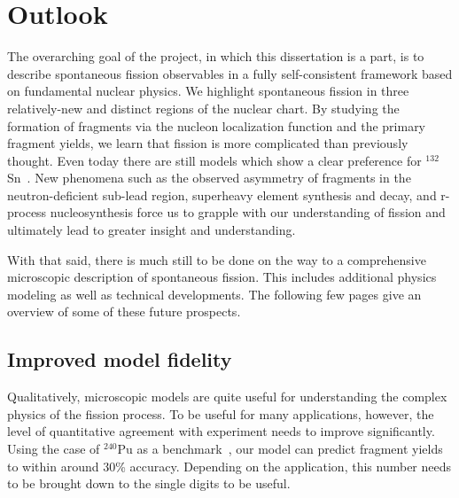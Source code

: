 \chapter{Outlook}\label{chap:Outlook}

The overarching goal of the project, in which this dissertation is a part, is to describe spontaneous fission observables in a fully self-consistent framework based on fundamental nuclear physics. We highlight spontaneous fission in three relatively-new and distinct regions of the nuclear chart. By studying the formation of fragments via the nucleon localization function and the primary fragment yields, we learn that fission is more complicated than previously thought. Even today there are still models which show a clear preference for $^{132}$Sn~\cite{Carjan2017}. New phenomena such as the observed asymmetry of fragments in the neutron-deficient sub-lead region, superheavy element synthesis and decay, and r-process nucleosynthesis force us to grapple with our understanding of fission and ultimately lead to greater insight and understanding.

With that said, there is much still to be done on the way to a comprehensive microscopic description of spontaneous fission. This includes additional physics modeling as well as technical developments. The following few pages give an overview of some of these future prospects.

\section{Improved model fidelity}
Qualitatively, microscopic models are quite useful for understanding the complex physics of the fission process. To be useful for many applications, however, the level of quantitative agreement with experiment needs to improve significantly. Using the case of $^{240}$Pu as a benchmark~\cite{Sadhukhan2016}, our model can predict fragment yields to within around 30\% accuracy. Depending on the application, this number needs to be brought down to the single digits to be useful.


